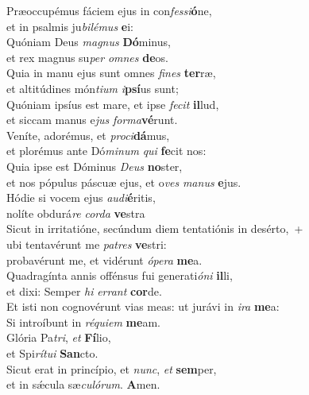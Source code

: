 \evenverse Præoccupémus fáciem ejus in con\textit{fes}\textit{si}\textbf{ó}ne,~\*\\
\evenverse et in psalmis ju\textit{bi}\textit{lé}\textit{mus} \textbf{e}i:\\
\oddverse Quóniam Deus \textit{ma}\textit{gnus} \textbf{Dó}minus,~\*\\
\oddverse et rex magnus su\textit{per} \textit{om}\textit{nes} \textbf{de}os.\\
\evenverse Quia in manu ejus sunt omnes \textit{fi}\textit{nes} \textbf{ter}ræ,~\*\\
\evenverse et altitúdines món\textit{ti}\textit{um} \textit{i}\textbf{psí}us sunt;\\
\oddverse Quóniam ipsíus est mare, et ipse \textit{fe}\textit{cit} \textbf{il}lud,~\*\\
\oddverse et siccam manus e\textit{jus} \textit{for}\textit{ma}\textbf{vé}runt.\\
\evenverse Veníte, adorémus, et \textit{pro}\textit{ci}\textbf{dá}mus,~\*\\
\evenverse et plorémus ante Dó\textit{mi}\textit{num} \textit{qui} \textbf{fe}cit nos:\\
\oddverse Quia ipse est Dóminus \textit{De}\textit{us} \textbf{no}ster,~\*\\
\oddverse et nos pópulus páscuæ ejus, et o\textit{ves} \textit{ma}\textit{nus} \textbf{e}jus.\\
\evenverse Hódie si vocem ejus \textit{au}\textit{di}\textbf{é}ritis,~\*\\
\evenverse nolíte obdurá\textit{re} \textit{cor}\textit{da} \textbf{ve}stra\\
\oddverse Sicut in irritatióne, secúndum diem tentatiónis in desérto,~+\\
\oddverse  ubi tentavérunt me \textit{pa}\textit{tres} \textbf{ve}stri:~\*\\
\oddverse probavérunt me, et vidérunt \textit{ó}\textit{pe}\textit{ra} \textbf{me}a.\\
\evenverse Quadragínta annis offénsus fui generati\textit{ó}\textit{ni} \textbf{il}li,~\*\\
\evenverse et dixi: Semper \textit{hi} \textit{er}\textit{rant} \textbf{cor}de.\\
\oddverse Et isti non cognovérunt vias meas: ut jurávi in \textit{i}\textit{ra} \textbf{me}a:~\*\\
\oddverse Si introíbunt in \textit{ré}\textit{qui}\textit{em} \textbf{me}am.\\
\evenverse Glória Pa\textit{tri}, \textit{et} \textbf{Fí}lio,~\*\\
\evenverse et Spi\textit{rí}\textit{tu}\textit{i} \textbf{San}cto.\\
\oddverse Sicut erat in princípio, et \textit{nunc}, \textit{et} \textbf{sem}per,~\*\\
\oddverse et in sǽcula sæ\textit{cu}\textit{ló}\textit{rum}. \textbf{A}men.\\
